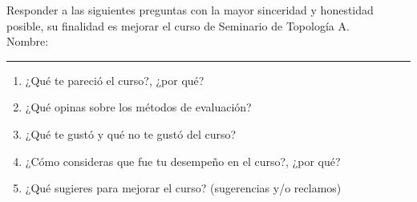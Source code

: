 \documentclass[12pt]{report}
\numberwithin{section}{chapter}
\begin{document}
Responder a las siguientes preguntas con la mayor sinceridad y honestidad posible, su finalidad es mejorar el curso de Seminario de Topología A.\\

Nombre: \rule{16cm}{0.1mm}

\begin{enumerate}
\item ¿Qué te pareció el curso?, ¿por qué?
\vspace{3cm}
\item ¿Qué opinas sobre los métodos de evaluación?
\vspace{3cm}
\item ¿Qué te gustó y qué no te gustó del curso?
\vspace{3cm}
\item ¿Cómo consideras que fue tu desempeño en el curso?, ¿por qué?
\vspace{3cm}
\item ¿Qué sugieres para mejorar el curso? (sugerencias y/o reclamos)
\end{enumerate}
\end{document}
